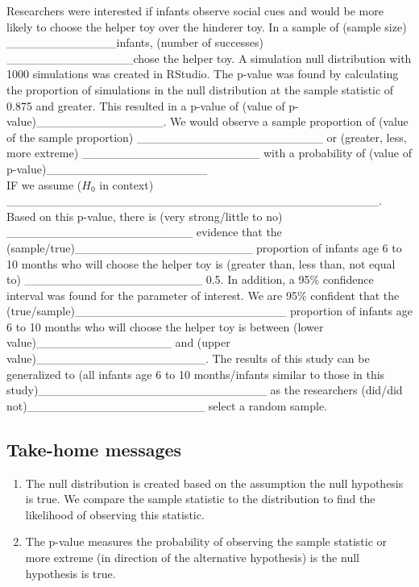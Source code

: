 \documentclass[
]{report}
\begin{document}
Researchers were interested if infants observe social cues and would be more likely to choose the helper toy over the hinderer toy. In a sample of (sample size) \_\_\_\_\_\_\_\_\_\_\_\_\_infants, (number of successes) \_\_\_\_\_\_\_\_\_\_\_\_\_\_\_chose the helper toy. A simulation null distribution with 1000 simulations was created in RStudio. The p-value was found by calculating the proportion of simulations in the null distribution at the sample statistic of 0.875 and greater. This resulted in a p-value of (value of p-value)\_\_\_\_\_\_\_\_\_\_\_\_\_\_\_. We would observe a sample proportion of (value of the sample proportion) \_\_\_\_\_\_\_\_\_\_\_\_\_\_\_\_\_\_\_\_\_\_ or (greater, less, more extreme) \_\_\_\_\_\_\_\_\_\_\_\_\_\_\_\_\_\_\_\_\_ with a probability of (value of p-value)\_\_\_\_\_\_\_\_\_\_\_\_\_\_\_\_\_\_\_\\
IF we assume (\(H_0\) in context) \_\_\_\_\_\_\_\_\_\_\_\_\_\_\_\_\_\_\_\_\_\_\_\_\_\_\_\_\_\_\_\_\_\_\_\_\_\_\_\_\_\_\_\_.
Based on this p-value, there is (very strong/little to no) \_\_\_\_\_\_\_\_\_\_\_\_\_\_\_\_\_\_\_\_\_\_ evidence that the (sample/true)\_\_\_\_\_\_\_\_\_\_\_\_\_\_\_\_\_\_\_\_\_ proportion of infants age 6 to 10 months who will choose the helper toy is (greater than, less than, not equal to) \_\_\_\_\_\_\_\_\_\_\_\_\_\_\_\_\_\_\_\_\_ 0.5. In addition, a 95\% confidence interval was found for the parameter of interest. We are 95\% confident that the (true/sample)\_\_\_\_\_\_\_\_\_\_\_\_\_\_\_\_\_\_\_\_\_\_\_\_\_ proportion of infants age 6 to 10 months who will choose the helper toy is between (lower value)\_\_\_\_\_\_\_\_\_\_\_\_\_\_\_\_ and (upper value)\_\_\_\_\_\_\_\_\_\_\_\_\_\_\_\_\_\_\_\_. The results of this study can be generalized to (all infants age 6 to 10 months/infants similar to those in this study)\_\_\_\_\_\_\_\_\_\_\_\_\_\_\_\_\_\_\_\_\_\_\_\_\_\_\_ as the researchers (did/did not)\_\_\_\_\_\_\_\_\_\_\_\_\_\_\_\_\_\_\_\_\_ select a random sample.


\hypertarget{take-home-messages-9}{%
\subsection{Take-home messages}\label{take-home-messages-9}}

\begin{enumerate}
\def\labelenumi{\arabic{enumi}.}
\item
  The null distribution is created based on the assumption the null hypothesis is true. We compare the sample statistic to the distribution to find the likelihood of observing this statistic.
\item
  The p-value measures the probability of observing the sample statistic or more extreme (in direction of the alternative hypothesis) is the null hypothesis is true.
\end{enumerate}
\end{document}
